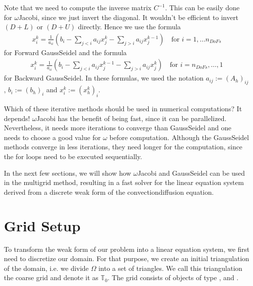\documentclass[letterpaper,10pt,english, openany]{sphinxmanual}
\begin{document}
Note that we need to compute the inverse matrix \(C^{-1}\). This can be easily done for \(\omega\)\sphinxhyphen{}Jacobi,
since we just invert the diagonal. It wouldn’t be efficient to invert \(\left( D + L \right)\) or \(\left( D + U \right)\) directly.
Hence we use the formula
\begin{equation*}
\begin{split}x_i^k = \frac{1}{a_{ii}}\left( b_i - \sum_{j < i}a_{ij}x_j^k - \sum_{j > i}a_{ij}x_j^{k-1} \right) \quad \text{for } i = 1, \dots n_{DoFs}\end{split}
\end{equation*}
for Forward Gauss\sphinxhyphen{}Seidel and the formula
\begin{equation*}
\begin{split}x_i^k = \frac{1}{a_{ii}}\left( b_i - \sum_{j < i}a_{ij}x_j^{k-1} - \sum_{j > i}a_{ij}x_j^{k} \right) \quad \text{for } i = n_{DoFs},  \dots, 1\end{split}
\end{equation*}
for Backward Gauss\sphinxhyphen{}Seidel. In these formulas, we used the notation \(a_{ij} := (A_h)_{ij}\), \(b_{i} := (b_h)_{i}\) and \(x_i^{k} := (x_h^{k})_i\).

Which of these iterative methods should be used in numerical computations? It depends!
\(\omega\)\sphinxhyphen{}Jacobi has the benefit of being fast, since it can be parallelized.
Nevertheless, it needs more iterations to converge than Gauss\sphinxhyphen{}Seidel and one needs to choose a good value for \(\omega\) before computation.
Although the Gauss\sphinxhyphen{}Seidel methods converge in less iterations, they need longer for the computation, since the for loops need to be executed sequentially.

In the next few sections, we will show how \(\omega\)\sphinxhyphen{}Jacobi and Gauss\sphinxhyphen{}Seidel can be used in the multigrid method,
resulting in a fast solver for the linear equation system derived from a discrete weak form of the convection\sphinxhyphen{}diffusion equation.


\section{Grid Setup}
\label{\detokenize{basics:grid-setup}}
To transform the weak form of our problem into a linear equation system,
we first need to discretize our domain. For that purpose, we create an initial triangulation of the domain,
i.e. we divide \(\Omega\) into a set of triangles. We call this triangulation the {\color{blue}coarse grid} and denote it as \(\mathbb{T}_0\).
The grid consists of objects of type ,  and .
\end{document}
